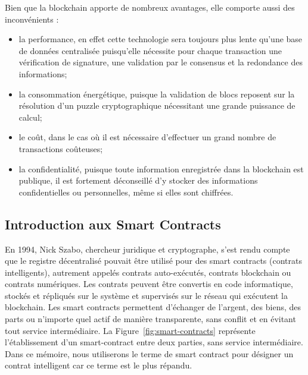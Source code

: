 \documentclass{tnreport}
\begin{document}
Bien que la blockchain apporte de nombreux avantages, elle comporte aussi des inconvénients :
\begin{itemize}
	\item la performance, en effet cette technologie sera toujours plus lente qu'une base de données centralisée puisqu'elle nécessite pour chaque transaction une vérification de signature, une validation par le consensus et la redondance des informations; 
	\item la consommation énergétique, puisque la validation de blocs reposent sur la résolution d'un puzzle cryptographique nécessitant une grande puissance de calcul; 
	\item le coût, dans le cas où il est nécessaire d'effectuer un grand nombre de transactions coûteuses;
	\item la confidentialité, puisque toute information enregistrée dans la blockchain est publique, il est fortement déconseillé d'y stocker des informations confidentielles ou personnelles, même si elles sont chiffrées.
\end{itemize}

\subsection{Introduction aux Smart Contracts}

En 1994, Nick Szabo, chercheur juridique et cryptographe, s'est rendu compte que le registre décentralisé pouvait être utilisé pour des smart contracts (contrats intelligents), autrement appelés contrats auto-exécutés, contrats blockchain ou contrats numériques.
Les contrats peuvent être convertis en code informatique, stockés et répliqués sur le système et supervisés sur le réseau qui exécutent la blockchain.
Les smart contracts permettent d'échanger de l'argent, des biens, des parts ou n'importe quel  actif de manière transparente, sans conflit et en évitant tout service intermédiaire.
La Figure~\ref{fig:smart-contracts} représente l'établissement d'un smart-contract entre deux parties, sans service intermédiaire. Dans ce mémoire, nous utiliserons le terme de smart contract pour désigner un contrat intelligent car ce terme est le plus répandu.
\end{document}
